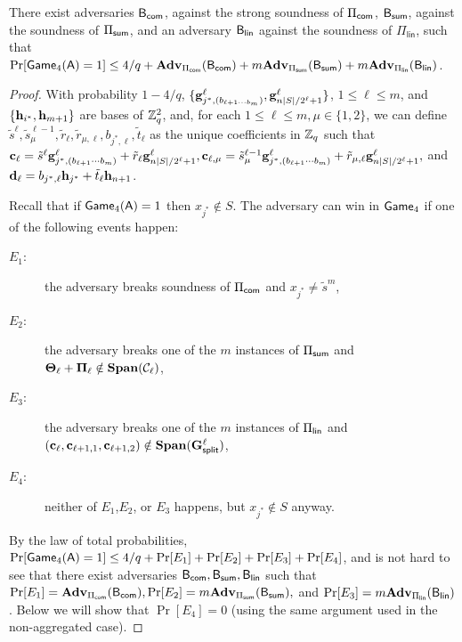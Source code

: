 \begin{lemma}
There exist adversaries $\mathsf{B}_{\mathsf{com}}$, against the strong soundness of $\Pi_{\mathsf{com}}$, $\mathsf{B}_{\mathsf{sum}}$, against the soundness of $\Pi_{\mathsf{sum}}$, and an adversary $\mathsf{B}_\mathsf{lin}$ against the soundness of $\Pi_\mathsf{lin}$, such that $\Pr[\mathsf{Game}_4(\mathsf{A})=1]\leq 4/q+ \mathbf{Adv}_{\Pi_{\mathsf{com}}}(\mathsf{B}_{\mathsf{com}})+m\mathbf{Adv}_{\Pi_{\mathsf{sum}}}(\mathsf{B}_{\mathsf{sum}})+m\mathbf{Adv}_{\Pi_\mathsf{lin}}(\mathsf{B}_\mathsf{lin})$.
\end{lemma}
\begin{proof}
With probability $1-4/q$, $\{\mathbf{g}_{j^*,(b_{\ell+1\cdots b_m})}^\ell,\mathbf{g}_{n|S|/2^\ell+1}^\ell\}$, $1\leq\ell\leq m$, and $\{\mathbf{h}_{i^*},\mathbf{h}_{m+1}\}$ are bases of $\mathbb{Z}_q^2$,
and, for each $1\leq\ell\leq m,\mu\in\{1,2\}$, we can define $\tilde{s}^\ell,\tilde{s}^{\ell-1}_\mu,\tilde{r}_\ell,\tilde{r}_{\mu,\ell},b_{j^*,\ell},\tilde{t}_\ell$ as the unique coefficients in $\mathbb{Z}_q$ such that $\mathbf{c}_\ell=\tilde{s}^\ell\mathbf{g}_{j^*,(b_{\ell+1}\cdots b_m)}^\ell + \tilde{r}_\ell \mathbf{g}_{n|S|/2^\ell+1}^\ell, \mathbf{c}_{\ell,\mu}=\tilde{s}^{\ell-1}_\mu\mathbf{g}_{j^*,(b_{\ell+1}\cdots b_m)}^\ell + \tilde{r}_{\mu,\ell} \mathbf{g}_{n|S|/2^\ell+1}^\ell,$ and $\mathbf{d}_\ell= b_{j^*,\ell} \mathbf{h}_{j^*} + \tilde{t}_\ell \mathbf{h}_{n+1}$.

Recall that if $\mathsf{Game}_4(\mathsf{A})=1$ then $x_{j^*}\notin S$. The adversary can win in $\mathsf{Game}_4$ if one of the following events happen:
\begin{description}
\item[$E_1$:] the adversary breaks soundness of $\Pi_{\mathsf{com}}$ and $x_{j^*}\neq \tilde{s}^m$,
\item[$E_2$:] the adversary breaks one of the $m$  instances of $\Pi_{\mathsf{sum}}$ and $\mathbf{{\Theta}}_\ell+\mathbf{{\Pi}}_\ell\notin\mathbf{Span}(\mathcal{C}_\ell)$,
\item[$E_3$:] the adversary breaks one of the $m$ instances of $\Pi_{\mathsf{lin}}$ and $(\mathbf{c}_{\ell},\mathbf{c}_{\ell+1,1},\mathbf{c}_{\ell+1,2})\notin\mathbf{Span}(\mathbf{{G}}_\mathsf{split}^\ell)$,
\item[$E_4$:] neither of $E_1$,$E_2$, or $E_3$ happens, but $x_{j^*}\notin S$ anyway.
\end{description}
By the law of total probabilities, $\Pr[\mathsf{Game}_4(\mathsf{A})=1]\leq 4/q+\Pr[E_1]+\Pr[E_2]+\Pr[E_3]+\Pr[E_4]$, and is not hard to see that there exist adversaries $\mathsf{B}_{\mathsf{com}},\mathsf{B}_{\mathsf{sum}},\mathsf{B}_\mathsf{lin}$ such that $\Pr[E_1]=\mathbf{Adv}_{\Pi_{\mathsf{com}}}(\mathsf{B}_{\mathsf{com}}),\Pr[E_2]=m\mathbf{Adv}_{\Pi_{\mathsf{sum}}}(\mathsf{B}_{\mathsf{sum}}),$ and $\Pr[E_3]=m\mathbf{Adv}_{\Pi_\mathsf{lin}}(\mathsf{B}_\mathsf{lin})$. Below we will show that $\Pr[E_4]=0$ (using the same argument used in the non-aggregated case).


\end{proof}
